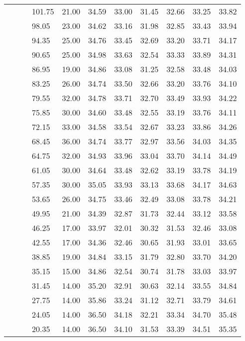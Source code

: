 \begin{longtable}{llllrrrrrrr}
   &  &  & 101.75 & 21.00 & 34.59 & 33.00 & 31.45 & 32.66 & 33.25 & 33.82 \\ 
   &  &  & 98.05 & 23.00 & 34.62 & 33.16 & 31.98 & 32.85 & 33.43 & 33.94 \\ 
   &  &  & 94.35 & 25.00 & 34.76 & 33.45 & 32.69 & 33.20 & 33.71 & 34.17 \\ 
   &  &  & 90.65 & 25.00 & 34.98 & 33.63 & 32.54 & 33.33 & 33.89 & 34.31 \\ 
   &  &  & 86.95 & 19.00 & 34.86 & 33.08 & 31.25 & 32.58 & 33.48 & 34.03 \\ 
   &  &  & 83.25 & 26.00 & 34.74 & 33.50 & 32.66 & 33.20 & 33.76 & 34.10 \\ 
   &  &  & 79.55 & 32.00 & 34.78 & 33.71 & 32.70 & 33.49 & 33.93 & 34.22 \\ 
   &  &  & 75.85 & 30.00 & 34.60 & 33.48 & 32.55 & 33.19 & 33.76 & 34.11 \\ 
   &  &  & 72.15 & 33.00 & 34.58 & 33.54 & 32.67 & 33.23 & 33.86 & 34.26 \\ 
   &  &  & 68.45 & 36.00 & 34.74 & 33.77 & 32.97 & 33.56 & 34.03 & 34.35 \\ 
   &  &  & 64.75 & 32.00 & 34.93 & 33.96 & 33.04 & 33.70 & 34.14 & 34.49 \\ 
   &  &  & 61.05 & 30.00 & 34.64 & 33.48 & 32.62 & 33.19 & 33.78 & 34.19 \\ 
   &  &  & 57.35 & 30.00 & 35.05 & 33.93 & 33.13 & 33.68 & 34.17 & 34.63 \\ 
   &  &  & 53.65 & 26.00 & 34.75 & 33.46 & 32.49 & 33.08 & 33.78 & 34.21 \\ 
   &  &  & 49.95 & 21.00 & 34.39 & 32.87 & 31.73 & 32.44 & 33.12 & 33.58 \\ 
   &  &  & 46.25 & 17.00 & 33.97 & 32.01 & 30.32 & 31.53 & 32.46 & 33.08 \\ 
   &  &  & 42.55 & 17.00 & 34.36 & 32.46 & 30.65 & 31.93 & 33.01 & 33.65 \\ 
   &  &  & 38.85 & 19.00 & 34.84 & 33.15 & 31.79 & 32.80 & 33.70 & 34.20 \\ 
   &  &  & 35.15 & 15.00 & 34.86 & 32.54 & 30.74 & 31.78 & 33.03 & 33.97 \\ 
   &  &  & 31.45 & 14.00 & 35.20 & 32.91 & 30.63 & 32.14 & 33.55 & 34.84 \\ 
   &  &  & 27.75 & 14.00 & 35.86 & 33.24 & 31.12 & 32.71 & 33.79 & 34.61 \\ 
   &  &  & 24.05 & 14.00 & 36.50 & 34.18 & 32.21 & 33.34 & 34.70 & 35.48 \\ 
   &  &  & 20.35 & 14.00 & 36.50 & 34.10 & 31.53 & 33.39 & 34.51 & 35.35 \\ 

\end{longtable}

